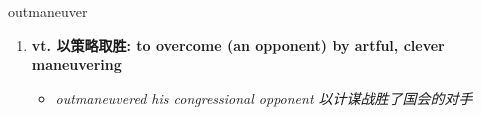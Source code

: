 
\begin{frame}
{\huge outmaneuver}
\begin{center}
\begin{enumerate}\Large
  \item \textbf{vt. 以策略取胜: to overcome (an opponent) by artful, clever maneuvering}
  \begin{itemize}
    \item \em{\Large{outmaneuvered his congressional opponent 以计谋战胜了国会的对手}}
  \end{itemize}
\end{enumerate}
\end{center}
\end{frame}
